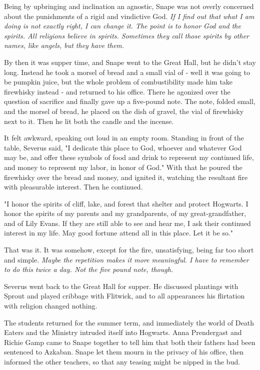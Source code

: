 \documentclass[a4paper,11pt]{article}
\begin{document}
Being by upbringing and inclination an agnostic, Snape was not overly concerned about the punishments of a rigid and vindictive God. \emph{If I find out that what I am doing is not exactly right, I can change it. The point is to honor God and the spirits. All religions believe in spirits. Sometimes they call those spirits by other names, like angels, but they have them.}

By then it was supper time, and Snape went to the Great Hall, but he didn't stay long. Instead he took a morsel of bread and a small vial of - well it was going to be pumpkin juice, but the whole problem of combustibility made him take firewhisky instead - and returned to his office. There he agonized over the question of sacrifice and finally gave up a five-pound note. The note, folded small, and the morsel of bread, he placed on the dish of gravel, the vial of firewhisky next to it. Then he lit both the candle and the incense.

It felt awkward, speaking out loud in an empty room. Standing in front of the table, Severus said, "I dedicate this place to God, whoever and whatever God may be, and offer these symbols of food and drink to represent my continued life, and money to represent my labor, in honor of God." With that he poured the firewhisky over the bread and money, and ignited it, watching the resultant fire with pleasurable interest. Then he continued.

"I honor the spirits of cliff, lake, and forest that shelter and protect Hogwarts. I honor the spirits of my parents and my grandparents, of my great-grandfather, and of Lily Evans. If they are still able to see and hear me, I ask their continued interest in my life. May good fortune attend all in this place. Let it be so."

That was it. It was somehow, except for the fire, unsatisfying, being far too short and simple. \emph{Maybe the repetition makes it more meaningful. I have to remember to do this twice a day. Not the five pound note, though.}

Severus went back to the Great Hall for supper. He discussed plantings with Sprout and played cribbage with Flitwick, and to all appearances his flirtation with religion changed nothing.

The students returned for the summer term, and immediately the world of Death Eaters and the Ministry intruded itself into Hogwarts. Anna Prendergast and Richie Gamp came to Snape together to tell him that both their fathers had been sentenced to Azkaban. Snape let them mourn in the privacy of his office, then informed the other teachers, so that any teasing might be nipped in the bud.
\end{document}
